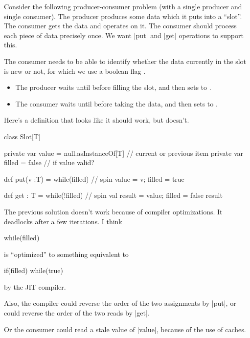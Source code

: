 

\begin{slide}

Consider the following producer-consumer problem (with a single producer and
single consumer).  The producer produces some data which it puts into a
``slot''.  The consumer gets the data and operates on it.  The consumer should
process each piece of data precisely once.  We want |put| and |get| operations
to support this. 

The consumer needs to be able to identify whether the data currently
in the slot is new or not, for which we use a boolean flag .
%
\begin{itemize}
\item The producer waits until  before filling the slot,
and then sets  to .

\item The consumer waits until  before taking the data,
and then sets  to .
\end{itemize}

\end{slide}


\begin{slide}

Here's a definition that looks like it should work, but doesn't.

\begin{scala}
class Slot[T]{
  private var value = null.asInstanceOf[T] // current or previous item
  private var filled = false                 // if value valid?

  def put(v :T) = {
    while(filled){  } // spin
    value = v; filled = true
  }

  def get : T = {
    while(!filled){  } // spin
    val result = value; filled = false
    result
  }
}
\end{scala}
\end{slide}


\begin{slide}

The previous solution doesn't work because of compiler optimizations.  It
deadlocks after a few iterations.  I think  
\begin{scala}
    while(filled){  } 
\end{scala}
is ``optimized'' to something equivalent to
\begin{scala}
    if(filled){ while(true){} }
\end{scala}
by the JIT compiler.

Also, the compiler could reverse the order of the two assignments by |put|, or
could reverse the order of the two reads by |get|.  

Or the consumer could read a stale value of |value|, because of the use of
caches.
\end{slide}

